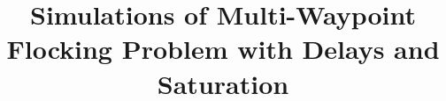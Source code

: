 \documentclass[10pt, conference, compsocconf]{IEEEtran}
\begin{document}
%
\title{Simulations of Multi-Waypoint Flocking Problem with Delays and Saturation}

\def\titleName{{\title}}
\def\authorName{{Taylor Johnson}}


\author{
}


% 






\maketitle
\end{document}
